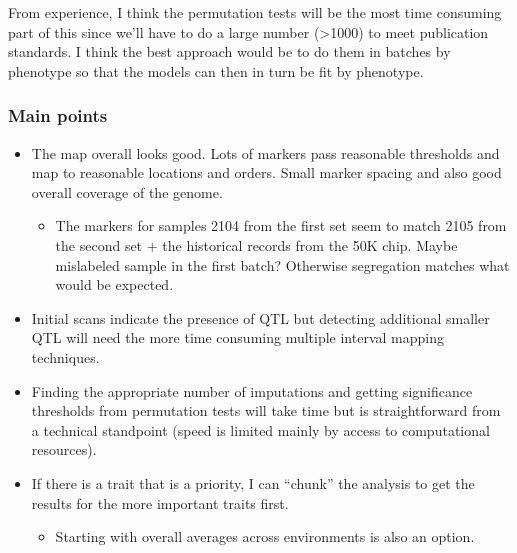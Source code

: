 \documentclass[
]{article}
\providecommand{\tightlist}{%
  \setlength{\itemsep}{0pt}\setlength{\parskip}{0pt}}
\begin{document}
From experience, I think the permutation tests will be the most time
consuming part of this since we'll have to do a large number
(\textgreater1000) to meet publication standards. I think the best
approach would be to do them in batches by phenotype so that the models
can then in turn be fit by phenotype.

\hypertarget{main-points}{%
\subsubsection{Main points}\label{main-points}}

\begin{itemize}
\tightlist
\item
  The map overall looks good. Lots of markers pass reasonable thresholds
  and map to reasonable locations and orders. Small marker spacing and
  also good overall coverage of the genome.

  \begin{itemize}
  \tightlist
  \item
    The markers for samples 2104 from the first set seem to match 2105
    from the second set + the historical records from the 50K chip.
    Maybe mislabeled sample in the first batch? Otherwise segregation
    matches what would be expected.
  \end{itemize}
\item
  Initial scans indicate the presence of QTL but detecting additional
  smaller QTL will need the more time consuming multiple interval
  mapping techniques.
\item
  Finding the appropriate number of imputations and getting significance
  thresholds from permutation tests will take time but is
  straightforward from a technical standpoint (speed is limited mainly
  by access to computational resources).
\item
  If there is a trait that is a priority, I can ``chunk'' the analysis
  to get the results for the more important traits first.

  \begin{itemize}
  \tightlist
  \item
    Starting with overall averages across environments is also an
    option.
  \end{itemize}
\end{itemize}
\end{document}
